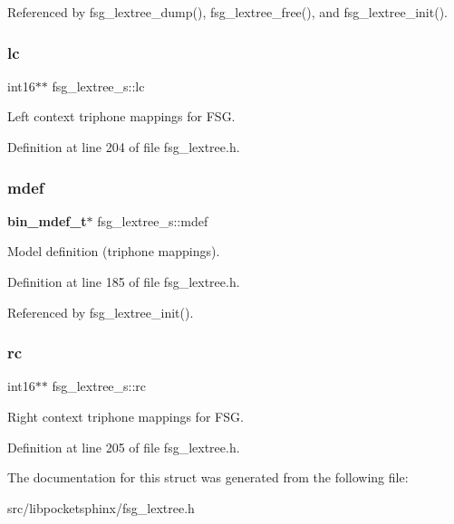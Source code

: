 Referenced by fsg\+\_\+lextree\+\_\+dump(), fsg\+\_\+lextree\+\_\+free(), and fsg\+\_\+lextree\+\_\+init().

\mbox{\label{structfsg__lextree__s_a0655f40ec98c9d971aba1fa8a894575d}} 
\subsubsection{lc}
{\footnotesize\ttfamily int16$\ast$$\ast$ fsg\+\_\+lextree\+\_\+s\+::lc}



Left context triphone mappings for F\+SG. 



Definition at line 204 of file fsg\+\_\+lextree.\+h.

\mbox{\label{structfsg__lextree__s_ae2c059413a1cb4cda7068ab30a7a477c}} 
\subsubsection{mdef}
{\footnotesize\ttfamily \textbf{ bin\+\_\+mdef\+\_\+t}$\ast$ fsg\+\_\+lextree\+\_\+s\+::mdef}



Model definition (triphone mappings). 



Definition at line 185 of file fsg\+\_\+lextree.\+h.



Referenced by fsg\+\_\+lextree\+\_\+init().

\mbox{\label{structfsg__lextree__s_a307d5351803d409aa51395333294c0f1}} 
\subsubsection{rc}
{\footnotesize\ttfamily int16$\ast$$\ast$ fsg\+\_\+lextree\+\_\+s\+::rc}



Right context triphone mappings for F\+SG. 



Definition at line 205 of file fsg\+\_\+lextree.\+h.



The documentation for this struct was generated from the following file\+:\begin{DoxyCompactItemize}
\item 
src/libpocketsphinx/fsg\+\_\+lextree.\+h\end{DoxyCompactItemize}
